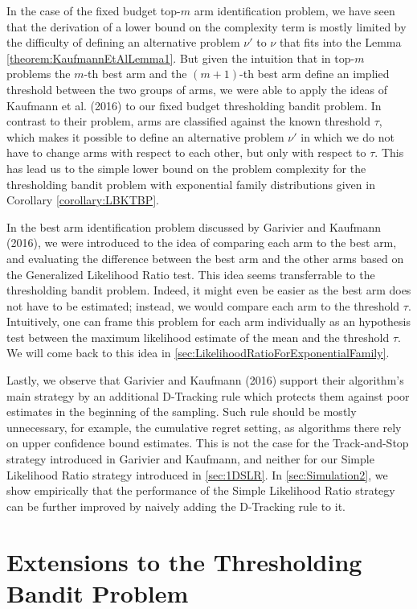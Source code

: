 \documentclass[11pt,]{article}
\begin{document}
In the case of the fixed budget top-\(m\) arm identification problem, we
have seen that the derivation of a lower bound on the complexity term is
mostly limited by the difficulty of defining an alternative problem
\(\nu'\) to \(\nu\) that fits into the Lemma
\ref{theorem:KaufmannEtAlLemma1}. But given the intuition that in
top-\(m\) problems the \(m\)-th best arm and the \((m+1)\)-th best arm
define an implied threshold between the two groups of arms, we were able
to apply the ideas of Kaufmann et al. (2016) to our fixed budget
thresholding bandit problem. In contrast to their problem, arms are
classified against the known threshold \(\tau\), which makes it possible
to define an alternative problem \(\nu'\) in which we do not have to
change arms with respect to each other, but only with respect to
\(\tau\). This has lead us to the simple lower bound on the problem
complexity for the thresholding bandit problem with exponential family
distributions given in Corollary \ref{corollary:LBKTBP}.

In the best arm identification problem discussed by Garivier and
Kaufmann (2016), we were introduced to the idea of comparing each arm to
the best arm, and evaluating the difference between the best arm and the
other arms based on the Generalized Likelihood Ratio test. This idea
seems transferrable to the thresholding bandit problem. Indeed, it might
even be easier as the best arm does not have to be estimated; instead,
we would compare each arm to the threshold \(\tau\). Intuitively, one
can frame this problem for each arm individually as an hypothesis test
between the maximum likelihood estimate of the mean and the threshold
\(\tau\). We will come back to this idea in
\autoref{sec:LikelihoodRatioForExponentialFamily}.

Lastly, we observe that Garivier and Kaufmann (2016) support their
algorithm's main strategy by an additional D-Tracking rule which
protects them against poor estimates in the beginning of the sampling.
Such rule should be mostly unnecessary, for example, the cumulative
regret setting, as algorithms there rely on upper confidence bound
estimates. This is not the case for the Track-and-Stop strategy
introduced in Garivier and Kaufmann, and neither for our Simple
Likelihood Ratio strategy introduced in \autoref{sec:1DSLR}. In
\autoref{sec:Simulation2}, we show empirically that the performance of
the Simple Likelihood Ratio strategy can be further improved by naively
adding the D-Tracking rule to it.

\section{\texorpdfstring{Extensions to the Thresholding Bandit Problem
\label{chap:Extensions}}{Extensions to the Thresholding Bandit Problem }}\label{extensions-to-the-thresholding-bandit-problem}
\end{document}
